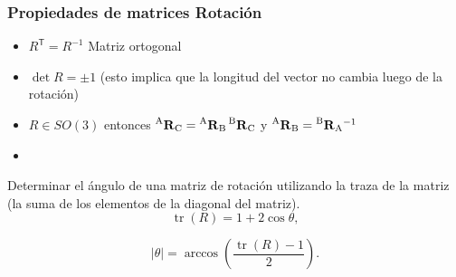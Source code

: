 \begin{frame}
    \frametitle{Propiedades de matrices Rotación}
    \small
    \begin{itemize}
        \item $R^{\mathsf {T}}=R^{-1}$ Matriz ortogonal
        \item $\det R = \pm 1$ (esto implica que la longitud del vector no cambia luego de la rotación)
        \item $R \in SO(3)$ entonces $\prescript{\mathrm{A}}{}{{\boldsymbol{\mathbf{R}}}_\mathrm{C}} = \prescript{\mathrm{A}}{}{{\boldsymbol{\mathbf{R}}}_\mathrm{B}} \prescript{\mathrm{B}}{}{{\boldsymbol{\mathbf{R}}}_\mathrm{C}}$ y $\prescript{\mathrm{A}}{}{{\boldsymbol{\mathbf{R}}}_\mathrm{B}} = \prescript{\mathrm{B}}{}{{\boldsymbol{\mathbf{R}}}_\mathrm{A}}^{-1}$
        \item {}
    \end{itemize}

    Determinar el ángulo de una matriz de rotación utilizando la traza de la matriz (la suma de los elementos de la diagonal del matriz).
    \begin{equation*}
        {\displaystyle \operatorname {tr} (R)=1+2\cos \theta ,}
    \end{equation*}

    \begin{equation*}
        {\displaystyle |\theta |=\arccos \left({\frac {\operatorname {tr} (R)-1}{2}}\right).}
    \end{equation*}

\end{frame}


